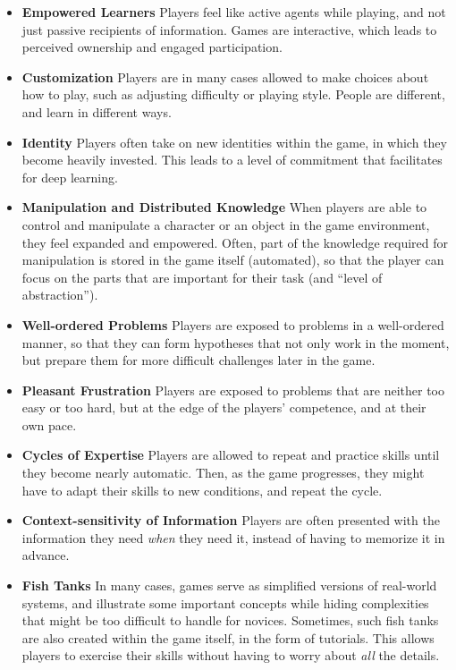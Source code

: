 \begin{itemize}
	\item{\textbf{Empowered Learners}} Players feel like active agents while playing, and not just passive recipients of information. Games are interactive, which leads to perceived ownership and engaged participation.
	\item{\textbf{Customization}} Players are in many cases allowed to make choices about how to play, such as adjusting difficulty or playing style. People are different, and learn in different ways.
	\item{\textbf{Identity}} Players often take on new identities within the game, in which they become heavily invested. This leads to a level of commitment that facilitates for deep learning.
	\item{\textbf{Manipulation and Distributed Knowledge}} When players are able to control and manipulate a character or an object in the game environment, they feel expanded and empowered. Often, part of the knowledge required for manipulation is stored in the game itself (automated), so that the player can focus on the parts that are important for their task (and ``level of abstraction'').
	\item{\textbf{Well-ordered Problems}} Players are exposed to problems in a well-ordered manner, so that they can form hypotheses that not only work in the moment, but prepare them for more difficult challenges later in the game.
	\item{\textbf{Pleasant Frustration}} Players are exposed to problems that are neither too easy or too hard, but at the edge of the players' competence, and at their own pace.
	\item{\textbf{Cycles of Expertise}} Players are allowed to repeat and practice skills until they become nearly automatic. Then, as the game progresses, they might have to adapt their skills to new conditions, and repeat the cycle.
	\item{\textbf{Context-sensitivity of Information}} Players are often presented with the information they need \emph{when} they need it, instead of having to memorize it in advance.
	\item{\textbf{Fish Tanks}} In many cases, games serve as simplified versions of real-world systems, and illustrate some important concepts while hiding complexities that might be too difficult to handle for novices. Sometimes, such fish tanks are also created within the game itself, in the form of tutorials. This allows players to exercise their skills without having to worry about \emph{all} the details.

\end{itemize}
